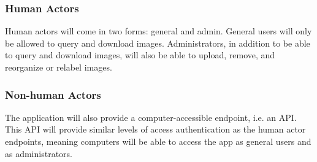 \subsubsection{Human Actors}
  Human actors will come in two forms: general and admin. General users will
  only be allowed to query and download images. Administrators, in addition to
  be able to query and download images, will also be able to upload, remove, and
  reorganize or relabel images.

\subsubsection{Non-human Actors}
  The application will also provide a computer-accessible endpoint, i.e. an API.
  This API will provide similar levels of access authentication as the human
  actor endpoints, meaning computers will be able to access the app as general
  users and as administrators.
